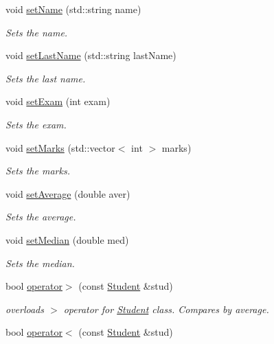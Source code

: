 \begin{DoxyCompactItemize}
void \mbox{\hyperlink{class_student_af289cfb2ae8a57077bd91062b9769719}{set\+Name}} (std\+::string name)
\begin{DoxyCompactList}\small\item\em Sets the name. \end{DoxyCompactList}\item 
void \mbox{\hyperlink{class_student_ab33cbd7f8da4c170dd7227d52b2fa8a0}{set\+Last\+Name}} (std\+::string last\+Name)
\begin{DoxyCompactList}\small\item\em Sets the last name. \end{DoxyCompactList}\item 
void \mbox{\hyperlink{class_student_a4ca92755dbd4575a66e6266408a62414}{set\+Exam}} (int exam)
\begin{DoxyCompactList}\small\item\em Sets the exam. \end{DoxyCompactList}\item 
void \mbox{\hyperlink{class_student_a393e0c0481850a2bc316894c252ec8b2}{set\+Marks}} (std\+::vector$<$ int $>$ marks)
\begin{DoxyCompactList}\small\item\em Sets the marks. \end{DoxyCompactList}\item 
void \mbox{\hyperlink{class_student_a70e7e26775d28c57a44eb30444ebe6cf}{set\+Average}} (double aver)
\begin{DoxyCompactList}\small\item\em Sets the average. \end{DoxyCompactList}\item 
void \mbox{\hyperlink{class_student_a18bd18da05116b937e6ace308da8b8d3}{set\+Median}} (double med)
\begin{DoxyCompactList}\small\item\em Sets the median. \end{DoxyCompactList}\item 
bool \mbox{\hyperlink{class_student_a9e9043b18fba023db54fb17fa29fc9b2}{operator$>$}} (const \mbox{\hyperlink{class_student}{Student}} \&stud)
\begin{DoxyCompactList}\small\item\em overloads $>$ operator for \mbox{\hyperlink{class_student}{Student}} class. Compares by average. \end{DoxyCompactList}\item 
bool \mbox{\hyperlink{class_student_acd100733dd2521ea46c739cbafa727f6}{operator$<$}} (const \mbox{\hyperlink{class_student}{Student}} \&stud)

\end{DoxyCompactItemize}
